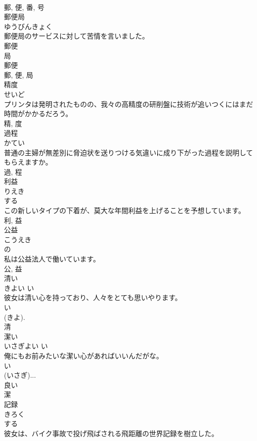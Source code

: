 \documentclass[8pt]{extreport}
\begin{document}
\begin{CJK}{UTF8}{min}
\\	郵, 便, 番, 号	
\\	郵便局	
\\	ゆうびんきょく	
\\	郵便局のサービスに対して苦情を言いました。	
\\	郵便 
\\	局 
\\	郵便 
\\	郵, 便, 局	
\\	精度	
\\	せいど	
\\	プリンタは発明されたものの、我々の高精度の研削盤に技術が追いつくにはまだ時間がかかるだろう。	
\\	精, 度	
\\	過程	
\\	かてい	
\\	普通の主婦が無差別に脅迫状を送りつける気違いに成り下がった過程を説明してもらえますか。	
\\	過, 程	
\\	利益	
\\	りえき	
\\	する 
\\	この新しいタイプの下着が、莫大な年間利益を上げることを予想しています。	
\\	利, 益	
\\	公益	
\\	こうえき	
\\	の 
\\	私は公益法人で働いています。	
\\	公, 益	
\\	清い	
\\	きよい	い 
\\	彼女は清い心を持っており、人々をとても思いやります。	
\\	い 
\\	(きよ).
\\	清	
\\	潔い	
\\	いさぎよい	い 
\\	俺にもお前みたいな潔い心があればいいんだがな。	
\\	い 
\\	(いさぎ)... 
\\	良い 
\\	潔	
\\	記録	
\\	きろく	
\\	する 
\\	彼女は、バイク事故で投げ飛ばされる飛距離の世界記録を樹立した。	

\end{CJK}
\end{document}
